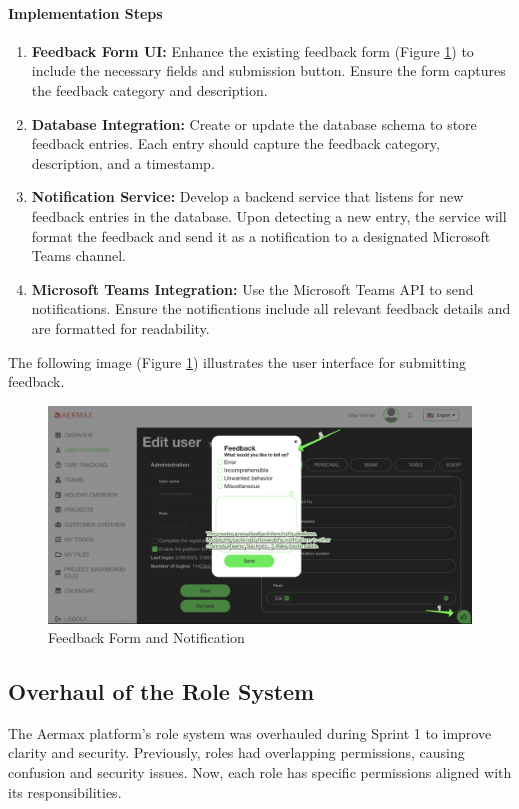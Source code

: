 \paragraph{Implementation Steps}
\begin{enumerate}
    \item \textbf{Feedback Form UI:} Enhance the existing feedback form (Figure \ref{fig:feedback_form}) to include the necessary fields and submission button. Ensure the form captures the feedback category and description.
    \item \textbf{Database Integration:} Create or update the database schema to store feedback entries. Each entry should capture the feedback category, description, and a timestamp.
    \item \textbf{Notification Service:} Develop a backend service that listens for new feedback entries in the database. Upon detecting a new entry, the service will format the feedback and send it as a notification to a designated Microsoft Teams channel.
    \item \textbf{Microsoft Teams Integration:} Use the Microsoft Teams API to send notifications. Ensure the notifications include all relevant feedback details and are formatted for readability.
\end{enumerate}

The following image (Figure \ref{fig:feedback_form}) illustrates the user interface for submitting feedback.

\begin{figure}[H]
    \centering
    \includegraphics[width=1\textwidth]{src/assets/images/TeamsNotification.png}
    \caption{Feedback Form and Notification}
    \label{fig:feedback_form}
\end{figure}

\subsection{Overhaul of the Role System}
The Aermax platform's role system was overhauled during Sprint 1 to improve clarity and security. Previously, roles had overlapping permissions, causing confusion and security issues. Now, each role has specific permissions aligned with its responsibilities.

